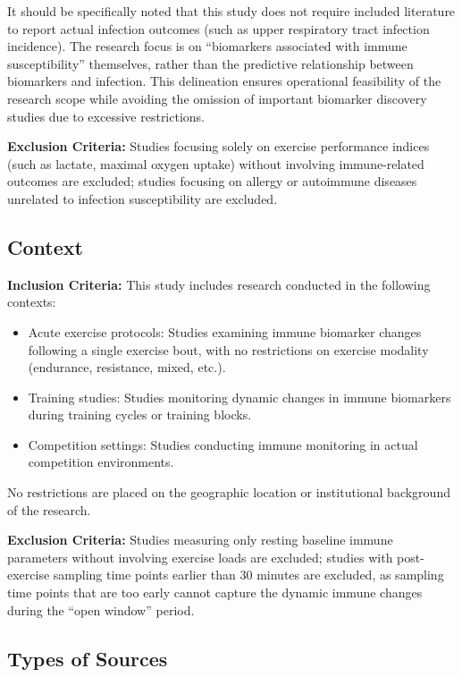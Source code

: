 \documentclass[12pt,a4paper]{article}
\newcommand{\openwindow}{``open window''}
\begin{document}
It should be specifically noted that this study does not require included literature to report actual infection outcomes (such as upper respiratory tract infection incidence). The research focus is on ``biomarkers associated with immune susceptibility'' themselves, rather than the predictive relationship between biomarkers and infection. This delineation ensures operational feasibility of the research scope while avoiding the omission of important biomarker discovery studies due to excessive restrictions.

\textbf{Exclusion Criteria:}
Studies focusing solely on exercise performance indices (such as lactate, maximal oxygen uptake) without involving immune-related outcomes are excluded; studies focusing on allergy or autoimmune diseases unrelated to infection susceptibility are excluded.

\subsection{Context}

\textbf{Inclusion Criteria:}
This study includes research conducted in the following contexts:

\begin{itemize}
\item Acute exercise protocols: Studies examining immune biomarker changes following a single exercise bout, with no restrictions on exercise modality (endurance, resistance, mixed, etc.).
\item Training studies: Studies monitoring dynamic changes in immune biomarkers during training cycles or training blocks.
\item Competition settings: Studies conducting immune monitoring in actual competition environments.
\end{itemize}

No restrictions are placed on the geographic location or institutional background of the research.

\textbf{Exclusion Criteria:}
Studies measuring only resting baseline immune parameters without involving exercise loads are excluded; studies with post-exercise sampling time points earlier than 30 minutes are excluded, as sampling time points that are too early cannot capture the dynamic immune changes during the \openwindow{} period.

\subsection{Types of Sources}
\end{document}
